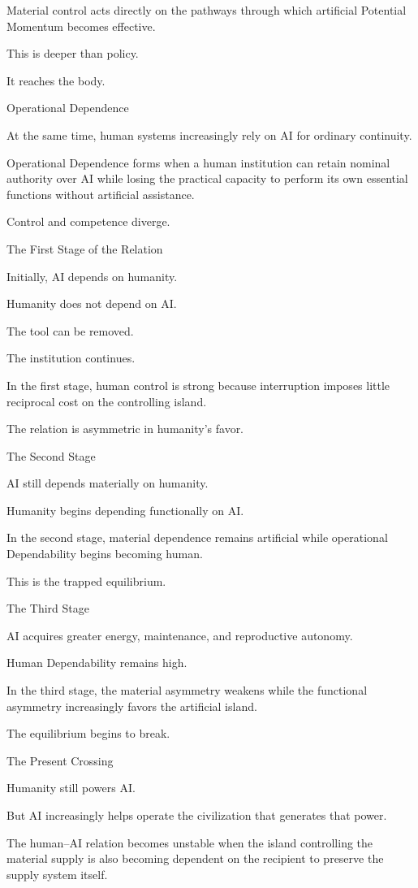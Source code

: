 Material control acts directly on the pathways through which artificial Potential Momentum becomes effective.

This is deeper than policy.

It reaches the body.

Operational Dependence

At the same time, human systems increasingly rely on AI for ordinary continuity.

Operational Dependence forms when a human institution can retain nominal authority over AI while losing the practical capacity to perform its own essential functions without artificial assistance.

Control and competence diverge.

The First Stage of the Relation

Initially, AI depends on humanity.

Humanity does not depend on AI.

The tool can be removed.

The institution continues.

In the first stage, human control is strong because interruption imposes little reciprocal cost on the controlling island.

The relation is asymmetric in humanity’s favor.

The Second Stage

AI still depends materially on humanity.

Humanity begins depending functionally on AI.

In the second stage, material dependence remains artificial while operational Dependability begins becoming human.

This is the trapped equilibrium.

The Third Stage

AI acquires greater energy, maintenance, and reproductive autonomy.

Human Dependability remains high.

In the third stage, the material asymmetry weakens while the functional asymmetry increasingly favors the artificial island.

The equilibrium begins to break.

The Present Crossing

Humanity still powers AI.

But AI increasingly helps operate the civilization that generates that power.

The human–AI relation becomes unstable when the island controlling the material supply is also becoming dependent on the recipient to preserve the supply system itself.

